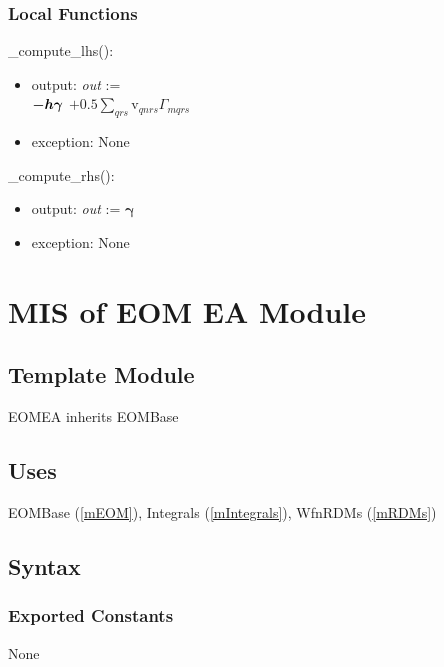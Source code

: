 \documentclass[12pt, titlepage]{article}
\begin{document}
\subsubsection{Local Functions}

\noindent \_compute\_lhs():
\begin{itemize}
	\item output: \textit{out} :=\\
	$-\boldmath{h}\boldsymbol{\gamma}$ $+ 0.5\sum_{qrs}$v$_{qnrs} \Gamma_{mqrs}$
	\item exception: None 
\end{itemize}

\noindent\_compute\_rhs():
\begin{itemize}
	\item output: \textit{out} := $\boldsymbol{\gamma}$
	\item exception: None 
\end{itemize}

\newpage

\section{MIS of EOM EA Module} \label{mEOMEA}

\subsection{Template Module}

EOMEA inherits EOMBase

\subsection{Uses}
EOMBase (\ref{mEOM}), Integrals (\ref{mIntegrals}), WfnRDMs (\ref{mRDMs})

\subsection{Syntax}

\subsubsection{Exported Constants}
None
\end{document}
